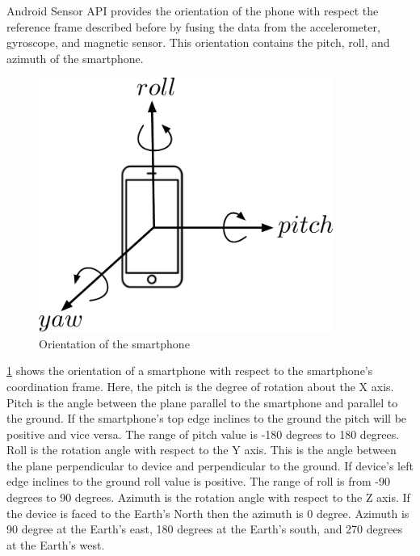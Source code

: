 Android Sensor API  provides the orientation of the phone with respect the reference frame described before by fusing the data from the accelerometer, gyroscope, and magnetic sensor. 
This orientation contains the pitch, roll, and azimuth of the smartphone. 

%

\begin{figure}
\centering
\includegraphics[width=3.8in]{figures/roll_pitch_yaw.pdf}
\caption{Orientation of the smartphone}
\label{f:rpy_dia}
\end{figure}

\ref{f:rpy_dia} shows the orientation of a smartphone with respect to the smartphone's coordination frame.
Here, the pitch is the degree of rotation about the X axis.
Pitch is the angle between the plane parallel to the smartphone and parallel to the ground. 
If the smartphone's top edge inclines to the ground the pitch will be positive and vice versa.
The range of pitch value is -180 degrees to 180 degrees.
Roll is the rotation angle with respect to the Y axis.
This is the angle between the plane perpendicular to device and perpendicular to the ground.
If device's left edge inclines to the ground roll value is positive.
The range of roll is from -90 degrees to 90 degrees.
Azimuth is the rotation angle with respect to the Z axis.
If the device is faced to the Earth's North then the azimuth is 0 degree.
Azimuth is 90 degree at the Earth's east, 180 degrees at the Earth's south, and 270 degrees at the Earth's west.


